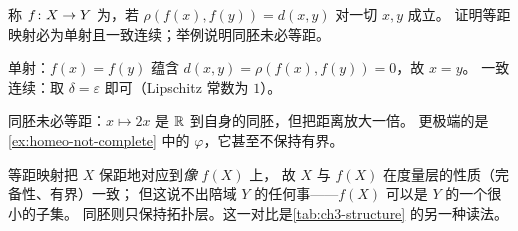 \begin{exercise}[延伸]
  \label{exr:isometry}
  称 \(f \colon X \to Y\) 为，若
  \(\rho(f(x),f(y)) = d(x,y)\) 对一切 \(x,y\) 成立。
  证明等距映射必为单射且一致连续；举例说明同胚未必等距。
  \begin{solution}
    单射：\(f(x)=f(y)\) 蕴含 \(d(x,y)=\rho(f(x),f(y))=0\)，故 \(x=y\)。
    一致连续：取 \(\delta=\varepsilon\) 即可（Lipschitz 常数为 \(1\)）。

    同胚未必等距：\(x \mapsto 2x\) 是 \(\mathbb{R}\) 到自身的同胚，但把距离放大一倍。
    更极端的是\cref{ex:homeo-not-complete} 中的 \(\varphi\)，它甚至不保持有界。

    等距映射把 \(X\) 保距地对应到\emph{像} \(f(X)\) 上，
    故 \(X\) 与 \(f(X)\) 在度量层的性质（完备性、有界）一致；
    但这说不出陪域 \(Y\) 的任何事——\(f(X)\) 可以是 \(Y\) 的一个很小的子集。
    同胚则只保持拓扑层。这一对比是\cref{tab:ch3-structure} 的另一种读法。
  \end{solution}
\end{exercise}

